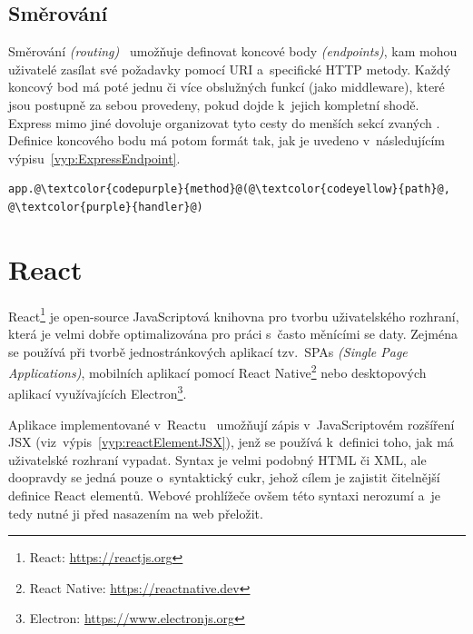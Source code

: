 \subsection{Směrování}
Směrování \emph{(routing)}~\cite{book:ExpressInAction, book:ProExpress} umožňuje definovat koncové body \emph{(endpoints)}, kam mohou uživatelé zasílat své požadavky pomocí URI a~specifické HTTP metody. Každý koncový bod má poté jednu či více obslužných funkcí (jako middleware), které jsou postupně za sebou provedeny, pokud dojde k~jejich kompletní shodě. Express mimo jiné dovoluje organizovat tyto cesty do menších sekcí zvaných \emph{}. Definice koncového bodu má potom formát tak, jak je uvedeno v~následujícím výpisu~\ref{vyp:ExpressEndpoint}.
\begin{center}
    \begin{lstlisting}[escapechar=@, label={vyp:ExpressEndpoint}, caption={Struktura definice koncového bodu v~Express.js. Kde \texttt{app} je instance třídy express, \texttt{method} je použitá HTTP metoda požadavku, \texttt{path} je cesta na serveru ke koncovému bodu a~\texttt{handler} je obslužná funkce.}]
        app.@\textcolor{codepurple}{method}@(@\textcolor{codeyellow}{path}@, @\textcolor{purple}{handler}@)
    \end{lstlisting}
\end{center}

\section{React}
\label{sec:React}
React\footnote{React: \url{https://reactjs.org}} je open-source JavaScriptová knihovna pro tvorbu uživatelského rozhraní, která je velmi dobře optimalizována pro práci s~často měnícími se daty. Zejména se používá při tvorbě jednostránkových aplikací tzv.~SPAs \emph{(Single Page Applications)}, mobilních aplikací pomocí React Native\footnote{React Native: \url{https://reactnative.dev}} nebo desktopových aplikací využívajících Electron\footnote{Electron: \url{https://www.electronjs.org}}. 

Aplikace implementované v~Reactu~\cite{book:LearningReact, website:EverythingReact} umožňují zápis v~JavaScriptovém rozšíření JSX (viz~výpis~\ref{vyp:reactElementJSX}), jenž se používá k~definici toho, jak má uživatelské rozhraní vypadat. Syntax je velmi podobný HTML či XML, ale doopravdy se jedná pouze o~syntaktický cukr, jehož cílem je zajistit čitelnější definice React elementů. Webové prohlížeče ovšem této syntaxi nerozumí a~je tedy nutné ji před nasazením na web přeložit. 

